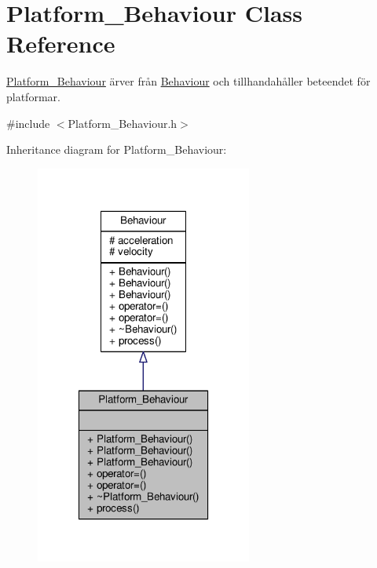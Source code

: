 \hypertarget{classPlatform__Behaviour}{\section{Platform\+\_\+\+Behaviour Class Reference}
\label{classPlatform__Behaviour}
}


\hyperlink{classPlatform__Behaviour}{Platform\+\_\+\+Behaviour} ärver från \hyperlink{classBehaviour}{Behaviour} och tillhandahåller beteendet för platformar.  




{\ttfamily \#include $<$Platform\+\_\+\+Behaviour.\+h$>$}



Inheritance diagram for Platform\+\_\+\+Behaviour\+:\nopagebreak
\begin{figure}[H]
\begin{center}
\leavevmode
\includegraphics[width=202pt]{classPlatform__Behaviour__inherit__graph}
\end{center}
\end{figure}


